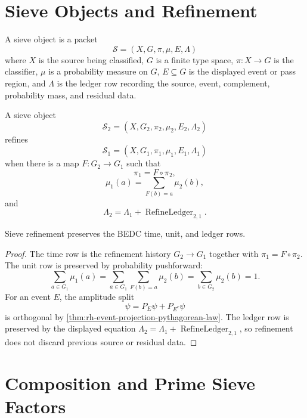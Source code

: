 \section{Sieve Objects and Refinement}
\label{sec:rh-prime-sieve-tower-sieve-objects}

\begin{definition}
\label{def:rh-sieve-object}
A sieve object is a packet
$$
\mathcal S=(X,G,\pi,\mu,E,\Lambda)
$$
where $X$ is the source being classified, $G$ is a finite type space,
$\pi:X\to G$ is the classifier, $\mu$ is a probability measure on $G$,
$E\subseteq G$ is the displayed event or pass region, and $\Lambda$ is
the ledger row recording the source, event, complement, probability
mass, and residual data.
\end{definition}

\begin{definition}
\label{def:rh-sieve-refinement}
A sieve object
$$
\mathcal S_2=(X,G_2,\pi_2,\mu_2,E_2,\Lambda_2)
$$
refines
$$
\mathcal S_1=(X,G_1,\pi_1,\mu_1,E_1,\Lambda_1)
$$
when there is a map $F:G_2\to G_1$ such that
$$
\pi_1=F\circ\pi_2,
$$
$$
\mu_1(a)=\sum_{F(b)=a}\mu_2(b),
$$
and
$$
\Lambda_2=\Lambda_1+\operatorname{RefineLedger}_{2,1}.
$$
\end{definition}

\begin{theorem}
\label{thm:rh-sieve-refinement-preserves-bedc-rows}
Sieve refinement preserves the BEDC time, unit, and ledger rows.
\end{theorem}

\begin{proof}
The time row is the refinement history $G_2\to G_1$ together with
$\pi_1=F\circ\pi_2$.  The unit row is preserved by probability
pushforward:
$$
\sum_{a\in G_1}\mu_1(a)
=
\sum_{a\in G_1}\sum_{F(b)=a}\mu_2(b)
=
\sum_{b\in G_2}\mu_2(b)
=1.
$$
For an event $E$, the amplitude split
$$
\psi=P_E\psi+P_{E^c}\psi
$$
is orthogonal by
\autoref{thm:rh-event-projection-pythagorean-law}.  The ledger row is
preserved by the displayed equation
$\Lambda_2=\Lambda_1+\operatorname{RefineLedger}_{2,1}$, so refinement
does not discard previous source or residual data.
\end{proof}

\section{Composition and Prime Sieve Factors}
\label{sec:rh-prime-sieve-tower-prime-factors}

